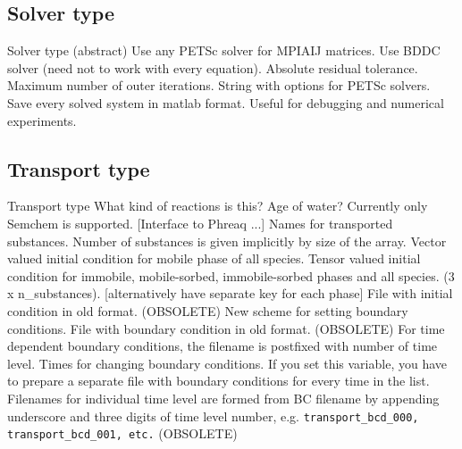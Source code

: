 \subsection{Solver type}
\begin{recordtype}{Solver type}{ (abstract)}
  Use any PETSc solver for MPIAIJ matrices.
  Use BDDC solver (need not to work with every equation).
 Absolute residual tolerance. 
 Maximum number of outer iterations.
 String with options for PETSc solvers.
 Save every solved system in matlab format. Useful for debugging and numerical experiments.
\end{recordtype}


\subsection{Transport type}
\begin{recordtype}{Transport type}{}
 What kind of reactions is this? Age of water?
 Currently only Semchem is supported. [Interface to Phreaq ...]
 Names for transported substances. Number of substances is given implicitly by size of the array.
 Vector valued initial condition for mobile phase of all species. 
 Tensor valued initial condition for immobile, mobile-sorbed, immobile-sorbed phases and all species. (3 x n\_substances).
 [alternatively have separate key for each phase]
 File with initial condition in old format. (OBSOLETE)
 New scheme for setting boundary conditions.
 File with boundary condition in old format. (OBSOLETE)
 For time dependent boundary conditions, the filename is postfixed with 
 number of time level.
  Times for changing boundary conditions. If you set this variable, you have to prepare a separate file with boundary conditions for every 
  time in the list. Filenames for individual time level are formed from BC filename by appending underscore and three digits of time level number, e.g. 
  {\tt transport\_bcd\_000, transport\_bcd\_001, etc.} (OBSOLETE)

\end{recordtype}

